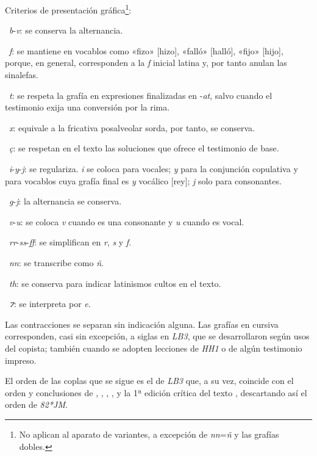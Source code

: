 \documentclass[11pt,a4paper,twoside]{article}
\newcommand{\comillas}[1]{«#1»}
\begin{document}
Criterios de presentación gráfica\footnote{No aplican al aparato de variantes, a excepción de \textit{nn}=\textit{ñ} y las grafías dobles.}:

~\textit{b}-\textit{v}: se conserva la alternancia.

~\textit{f}: se mantiene en vocablos como \comillas{fizo} [hizo], \comillas{falló} [halló], \comillas{fijo} [hijo], porque, en general, corresponden a la \textit{f} inicial latina y, por tanto anulan las sinalefas.

~\textit{t}: se respeta la grafía en expresiones finalizadas en -\textit{at}, salvo cuando el testimonio exija una conversión por la rima.

~\textit{x}: equivale a la fricativa posalveolar sorda, por tanto, se conserva.

~\textit{ç}: se respetan en el texto las soluciones que ofrece el testimonio de base.

~\textit{i}-\textit{y}-\textit{j}: se regulariza. \textit{i} se coloca para vocales; \textit{y} para la conjunción copulativa y para vocablos cuya grafía final es \textit{y} vocálico [rey]; \textit{j} solo para consonantes.

~\textit{g}-\textit{j}: la alternancia se conserva.

~\textit{v}-\textit{u}: se coloca \textit{v} cuando es una consonante y \textit{u} cuando es vocal.

~\textit{rr}-\textit{ss}-\textit{ff}: se simplifican en \textit{r}, \textit{s} y \textit{f}.

~\textit{nn}: se transcribe como \textit{ñ}.

~\textit{th}: se conserva para indicar latinismos cultos en el texto.

~\textit{⁊}: se interpreta por \textit{e}.

Las contracciones se separan sin indicación alguna. Las grafías en cursiva corresponden, casi sin excepción, a siglas en \textit{LB3}, que se desarrollaron según usos del copista; también cuando se adopten lecciones de \textit{HH1} o de algún testimonio impreso.

El orden de las coplas que se sigue es el de \textit{LB3} que, a su vez, coincide con el orden y conclusiones de \textcite{Senabre1983}, \textcite{Palumbo1983}, \textcite{Orduna1967}, \textcite{Beltrán1991,Beltrán2013}, \textcite{PérezPriego1990,PérezPriego2017} y la 1ª edición crítica del texto \parencite{Foulché-Delbosc1902}, descartando así el orden de \textit{82*JM}.
\end{document}
